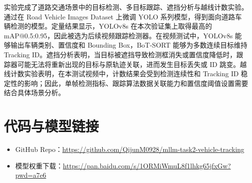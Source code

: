 \documentclass[UTF8,a4paper,12pt]{ctexart}
\begin{document}
实验完成了道路交通场景中的目标检测、多目标跟踪、遮挡分析与越线计数实验。通过在 Road Vehicle Images Dataset 上微调 YOLO 系列模型，得到面向道路车辆检测的模型。定量结果显示，YOLOv8s 在本次验证集上取得最高的 mAP@0.5:0.95，因此被选为后续视频跟踪检测器。在视频测试中，YOLOv8s 能够输出车辆类别、置信度和 Bounding Box，BoT-SORT 能够为多数连续目标维持 Tracking ID。遮挡分析表明，当目标被遮挡导致检测框消失或置信度降低时，跟踪器可能无法将重新出现的目标与原轨迹关联，进而发生目标丢失或 ID 跳变。越线计数实验表明，在本测试视频中，计数结果会受到检测连续性和 Tracking ID 稳定性的影响；因此，单帧检测指标、跟踪算法数据关联能力和置信度阈值设置需要结合具体场景分析。

\section*{代码与模型链接}

\begin{itemize}
    \item GitHub Repo：\url{https://github.com/QijunM0928/mllm-task2-vehicle-tracking}
    \item 模型权重下载：\url{https://pan.baidu.com/s/1ORMiWmuL8f1lhkg65jfxGw?pwd=a7e6}
\end{itemize}
\end{document}
